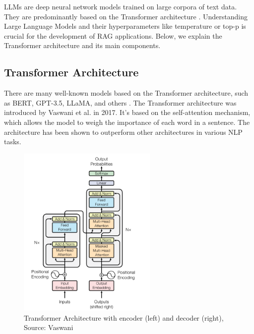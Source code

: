 LLMs are deep neural network models trained on large corpora of text data. They are predominantly based on the Transformer architecture \cite{Wolf.09.10.2019}. Understanding Large Language Models and their hyperparameters like temperature or top-p is crucial for the development of RAG applications. Below, we explain the Transformer architecture and its main components.

\subsection{Transformer Architecture}
There are many well-known models based on the Transformer architecture, such as BERT, GPT-3.5, LLaMA, and others \cite{Yin.2024}. The Transformer architecture was introduced by Vaswani et al. in 2017. It's based on the self-attention mechanism, which allows the model to weigh the importance of each word in a sentence. The architecture has been shown to outperform other architectures in various NLP tasks.

\begin{figure}[!ht]
    \centering
    \includegraphics[width=0.6\textwidth]{images/transformers_architecture.png}
    \caption{Transformer Architecture with encoder (left) and decoder (right), Source: Vaswani \cite{vaswani2023attentionneed}}
    \label{fig:transformer_architecture}
\end{figure}

